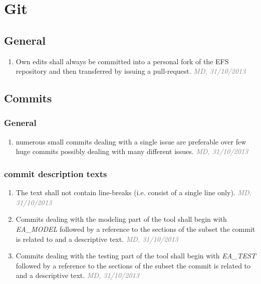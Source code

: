\documentclass[draft, a4paper, oneside]{scrreprt}
\let\emph\textsl
\newcommand{\ruleauthor}[2]{\mbox{}\newline\mbox{}\hfill{\footnotesize\textcolor{gray}{\emph{#1, #2}}}\xspace}
\begin{document}
\chapter{Git}
\section{General}
\begin{enumerate}
\item Own edits shall always be committed into a personal fork of the EFS repository and then transferred by issuing a pull-request. \ruleauthor{MD}{31/10/2013}
\end{enumerate}

\section{Commits}
\subsection{General}
\begin{enumerate}
\item numerous small commits dealing with a single issue are preferable over few huge commits possibly dealing with many different issues. \ruleauthor{MD}{31/10/2013}
\end{enumerate}

\subsection{commit description texts}
\begin{enumerate}
\item The text shall not contain line-breaks (i.e. consist of a single line only). \ruleauthor{MD}{31/10/2013}
\item Commits dealing with the modeling part of the tool shall begin with \emph{EA_MODEL} followed by a reference to the sections of the subset the commit is related to and a descriptive text. \ruleauthor{MD}{31/10/2013}
\item Commits dealing with the testing part of the tool shall begin with \emph{EA_TEST} followed by a reference to the sections of the subset the commit is related to and a descriptive text. \ruleauthor{MD}{31/10/2013}
\end{enumerate}

\listoffixmes
\end{document}
